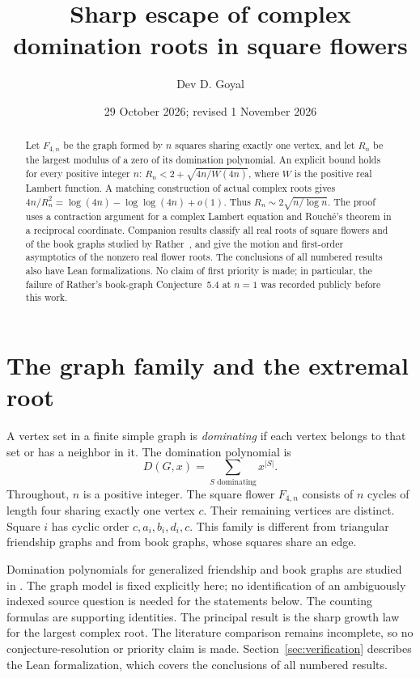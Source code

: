 \documentclass[11pt,a4paper]{article}
\title{Sharp escape of complex domination roots in square flowers}
\author{Dev D. Goyal}
\date{29 October 2026; revised 1 November 2026}
\begin{document}
\maketitle
\begin{abstract}
Let $F_{4,n}$ be the graph formed by $n$ squares sharing exactly one vertex,
and let $R_n$ be the largest modulus of a zero of its domination polynomial.
An explicit bound holds for every positive integer $n$:
$R_n<2+\sqrt{4n/W(4n)}$, where $W$ is the positive real Lambert function.
A matching construction of actual complex roots gives
$4n/R_n^2=\log(4n)-\log\log(4n)+o(1)$.
Thus $R_n\sim2\sqrt{n/\log n}$.
The proof uses a contraction argument for a complex Lambert equation and
Rouch\'e's theorem in a reciprocal coordinate.
Companion results classify all real roots of square flowers and of the book
graphs studied by Rather~\cite{rather2026}, and give the motion and
first-order asymptotics of the nonzero real flower roots.
The conclusions of all numbered results also have Lean formalizations.
No claim of first priority is made; in particular, the failure of Rather's
book-graph Conjecture~5.4 at $n=1$ was recorded publicly before this work.
\end{abstract}

\section{The graph family and the extremal root}
A vertex set in a finite simple graph is \emph{dominating} if each vertex
belongs to that set or has a neighbor in it. The domination polynomial is
\[
 D(G,x)=\sum_{S\text{ dominating}}x^{|S|}.
\]
Throughout, $n$ is a positive integer. The square flower $F_{4,n}$ consists
of $n$ cycles of length four sharing exactly one vertex $c$. Their remaining
vertices are distinct. Square $i$ has cyclic order $c,a_i,b_i,d_i,c$.
This family is different from triangular friendship graphs and from book
graphs, whose squares share an edge.

Domination polynomials for generalized friendship and book graphs are studied
in \cite{jahari2015,rather2026}. The graph model is fixed explicitly here;
no identification of an ambiguously indexed source question is needed for
the statements below. The counting formulas are supporting identities.
The principal result is the sharp growth law for the largest complex root.
The literature comparison remains incomplete, so no conjecture-resolution or
priority claim is made. Section~\ref{sec:verification} describes the Lean
formalization, which covers the conclusions of all numbered results.
\end{document}
